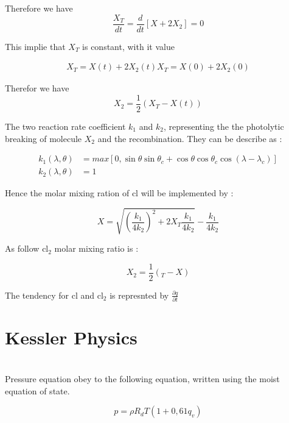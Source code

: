 \documentclass[times,doublespace]{fldauth}
\begin{document}
Therefore we have 
\begin{equation}
\frac{X_T}{dt}= \frac{d}{dt}[X+2X_2]=0
\end{equation}

This implie that $X_T$ is constant, with it value

\begin{equation}
\begin{split}
X_T=X(t)+2X_2(t)
X_T=X(0)+2X_2(0)
\end{split}
\end{equation}

Therefor we have
\begin{equation}
X_2=\frac{1}{2}(X_T-X(t))
\end{equation}

The two reaction rate coefficient  $k_1$ and $k_2$, representing the the photolytic breaking of molecule $X_2$ and the recombination. They can be describe as : 

\begin {equation}
\begin{split}
k_1(\lambda,\theta)&= max[0,\sin\theta\sin\theta_c+\cos\theta\cos\theta_c
\cos(\lambda-\lambda_c)] \\
k_2(\lambda,\theta)&=1
\end{split}
\end{equation}

Hence the molar mixing ration of cl will be implemented by :

\begin{equation}
X=\sqrt{\left(\frac{k_1}{4 k_2}\right)^2+2 X_T \frac{k_1}{4k_2} } - \frac{k_1}{4k_2}
\end{equation}

As follow $\text{cl}_2$ molar mixing ratio is :

\begin{equation}
X_2=\frac{1}{2}(_T-X)
\end{equation}

The tendency for cl and $\text{cl}_2$ is represnted by $ \frac{\partial q}{\partial t}$

\clearpage
\section{Kessler Physics}

~\\Pressure equation obey to the following equation, written using the moist equation of state.

\begin{equation}
p=\rho R_dT(1+0,61q_v)
\end{equation}
\end{document}

